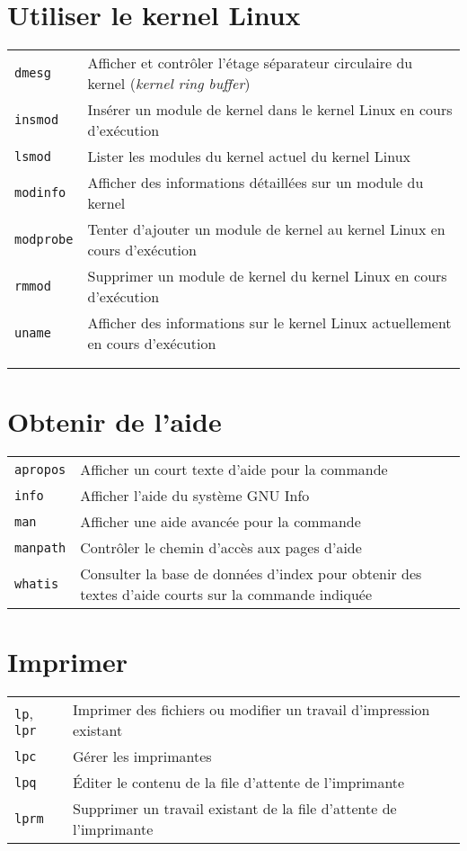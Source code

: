 \documentclass[10pt,a4paper]{article}
\begin{document}
\begin{multicols}{2}
\section{Utiliser le kernel Linux}
\begin{tabular}{ p{2.5cm} p{8.5cm} }
  \hline
  \texttt{dmesg} & Afficher et contrôler l'étage séparateur circulaire du kernel (\textit{kernel ring buffer})\\
  \texttt{insmod} & Insérer un module de kernel dans le kernel Linux en cours d'exécution\\
  \texttt{lsmod} & Lister les modules du kernel actuel du kernel Linux\\
  \texttt{modinfo} & Afficher des informations détaillées sur un module du kernel\\
  \texttt{modprobe} & Tenter d'ajouter un module de kernel au kernel Linux en cours d'exécution\\
  \texttt{rmmod} & Supprimer un module de kernel du kernel Linux en cours d'exécution \\
  \texttt{uname} & Afficher des informations sur le kernel Linux actuellement en cours d'exécution\\
  \hline
  & \\
  & \\
\end{tabular}

\section{Obtenir de l'aide}
\begin{tabular}{ p{2.5cm} p{8.5cm} }
  \hline
  \texttt{apropos} & Afficher un court texte d'aide pour la commande \\
  \texttt{info} & Afficher l'aide du système GNU Info \\
  \texttt{man} & Afficher une aide avancée pour la commande \\
  \texttt{manpath} & Contrôler le chemin d'accès aux pages d'aide \\
  \texttt{whatis} & Consulter la base de données d'index pour obtenir des textes d'aide courts sur la commande indiquée \\
  \hline
\end{tabular}

\section{Imprimer}
\begin{tabular}{ p{2.5cm} p{8.5cm} }
  \hline
  \texttt{lp}, \texttt{lpr} & Imprimer des fichiers ou modifier un travail \newline d'impression existant\\
  \texttt{lpc} & Gérer les imprimantes \\
  \texttt{lpq} & Éditer le contenu de la file d'attente de l'imprimante\\
  \texttt{lprm} & Supprimer un travail existant de la file d'attente de l'imprimante \\
  \hline
\end{tabular}


\end{multicols}
\end{document}
